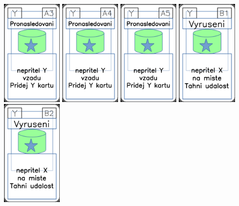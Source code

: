 \documentclass[a4paper]{article}
\begin{document}
	\includegraphics[width=3.0cm]{img-5_32}
	\includegraphics[width=3.0cm]{img-5_33}
	\includegraphics[width=3.0cm]{img-5_34}
	\includegraphics[width=3.0cm]{img-5_35}
	\includegraphics[width=3.0cm]{img-5_36}
\end{document}
